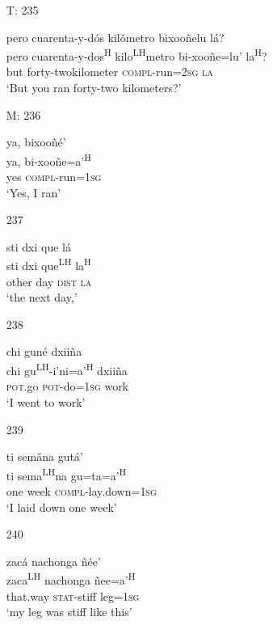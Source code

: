\begin{itemize}
\item[T: 235]
 
pero cuarenta-y-d\'{o}s kil\v{o}metro bixoo\~{n}elu l\'{a}?\\
pero cuarenta-y-dos\textsuperscript{H} kilo\textsuperscript{LH}metro bi-xoo\~{n}e=lu' la\textsuperscript{H}?\\
but forty-twokilometer \textsc{compl}-run=\textsc{2sg} \textsc{la}\\
\glt `But you ran forty-two kilometers?'
 

\item[M: 236]
 
\glll   ya, bixoo\~{n}\'{e}'\\
 ya, bi-xoo\~{n}e=a'\textsuperscript{H}\\
yes \textsc{compl}-run=\textsc{1sg}\\
\glt `Yes, I ran'
 



\item[237]

\glll   sti dxi que l\'{a}\\
 sti dxi que\textsuperscript{LH} la\textsuperscript{H}\\
other day \textsc{dist} \textsc{la}\\
\glt `the next day,'
 

\item[238]
 
\glll   chi gun\'{e} dxii\~{n}a\\
  chi gu\textsuperscript{LH}-i'ni=a'\textsuperscript{H} dxii\~{n}a\\
\textsc{pot}.go \textsc{pot}-do=\textsc{1sg} work\\
\glt `I went to work'
 



\item[239]
 
\glll   ti sem\v{a}na gut\'{a}'\\
 ti sema\textsuperscript{LH}na gu=ta=a'\textsuperscript{H}\\
one week \textsc{compl}-lay.down=\textsc{1sg}\\
\glt `I laid down one week' 
 


\item[240]
 
\glll  zac\'{a} nachonga \~{n}\'{e}e'\\
zaca\textsuperscript{LH} nachonga \~{n}ee=a'\textsuperscript{H}\\
that.way \textsc{stat}-stiff leg=\textsc{1sg}\\
\glt `my leg was stiff like this'
 



\end{itemize}
